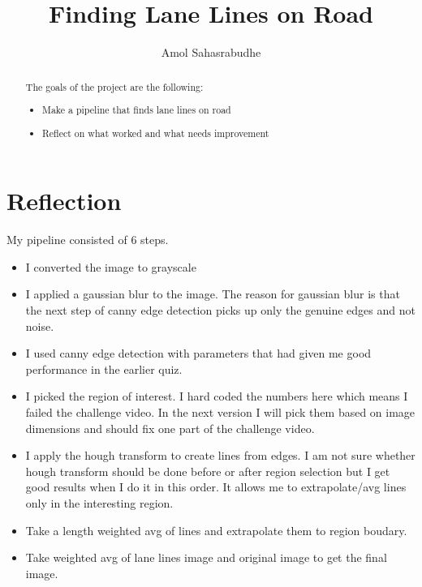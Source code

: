 \documentclass{article}
\begin{document}
\title{Finding Lane Lines on Road}
\author{Amol Sahasrabudhe}
\maketitle
\begin{abstract}
The goals of the project are the following:
\begin{itemize}
\item Make a pipeline that finds lane lines on road
\item Reflect on what worked and what needs improvement
\end{itemize}
\end{abstract}
\section{Reflection}
My pipeline consisted of 6 steps.
\begin{itemize}
\item I converted the image to grayscale
\item  I applied a gaussian blur to the image. The reason for gaussian blur is that the next step of canny edge detection picks up only the genuine edges and not noise.
\item I used canny edge detection with parameters that had given me good performance in the earlier quiz.
\item I picked the region of interest. I  hard coded the numbers here which 
means I failed the challenge video. In the next version I will pick them based on image dimensions and should fix one part of the challenge video.
\item I apply the hough transform to create lines from edges. I am not sure whether hough transform should be done before or after region selection but I get good results when I do it in this order. 
It allows me to extrapolate/avg lines only in the interesting region.
\item Take a length weighted avg of lines and extrapolate them to region boudary.
\item Take weighted avg of lane lines image and original image to get the final image.
\end{itemize}
\end{document}
